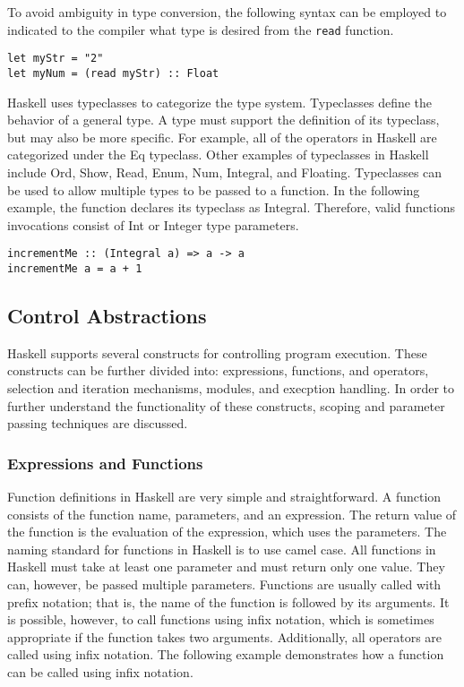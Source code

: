 \documentclass[titlepage,12pt]{article}
\begin{document}
To avoid ambiguity in type conversion, the following syntax can be employed to indicated to the compiler what type
is desired from the \texttt{read} function.

\begin{verbatim}
let myStr = "2"
let myNum = (read myStr) :: Float
\end{verbatim}


Haskell uses typeclasses to categorize the type system. Typeclasses define the behavior of a general type. 
A type must support the definition of its typeclass, but may also be more specific. For example, all of the 
operators in Haskell are categorized under the Eq typeclass. Other examples of typeclasses in Haskell include Ord, 
Show, Read, Enum, Num, Integral, and Floating. Typeclasses can be used to allow multiple types to be passed to a 
function. In the following example, the function declares its typeclass as Integral. Therefore, valid functions invocations consist
of Int or Integer type parameters.

\begin{verbatim}
incrementMe :: (Integral a) => a -> a
incrementMe a = a + 1
\end{verbatim}

\subsection{Control Abstractions}

Haskell supports several constructs for controlling program execution.  These constructs can be further divided into:
expressions, functions, and operators, selection and iteration mechanisms, modules, and execption handling.
In order to further understand the functionality of these constructs, scoping and parameter passing techniques are discussed.

\subsubsection{Expressions and Functions}

Function definitions in Haskell are very simple and straightforward. A function consists of the function name, 
parameters, and an expression. The return value of the function is the evaluation of the expression, which 
uses the parameters. The naming standard for functions in Haskell is to use camel case. All functions in 
Haskell must take at least one parameter and must return only one value. They can, however, be passed 
multiple parameters. Functions are usually called with prefix notation; that is, the name of the function is 
followed by its arguments. It is possible, however, to call functions using infix notation, which is sometimes appropriate 
if the function takes two arguments. Additionally, all operators are called using infix notation. The following example 
demonstrates how a function can be called using infix notation. 
\end{document}

